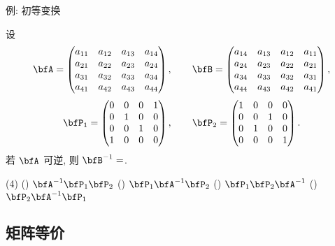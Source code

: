 \begin{frame}{例: 初等变换}
	\onslide<+->
	\begin{exercise}
		设\[\bfA=\begin{pmatrix}
			a_{11}&a_{12}&a_{13}&a_{14}\\
			a_{21}&a_{22}&a_{23}&a_{24}\\
			a_{31}&a_{32}&a_{33}&a_{34}\\
			a_{41}&a_{42}&a_{43}&a_{44}
		\end{pmatrix},\qquad\bfB=\begin{pmatrix}
			a_{14}&a_{13}&a_{12}&a_{11}\\
			a_{24}&a_{23}&a_{22}&a_{21}\\
			a_{34}&a_{33}&a_{32}&a_{31}\\
			a_{44}&a_{43}&a_{42}&a_{41}
		\end{pmatrix},\]\[\bfP_1=\begin{pmatrix}
			0&0&0&1\\
			0&1&0&0\\
			0&0&1&0\\
			1&0&0&0
		\end{pmatrix},\qquad\bfP_2=\begin{pmatrix}
			1&0&0&0\\
			0&0&1&0\\
			0&1&0&0\\
			0&0&0&1
		\end{pmatrix}.\]
		若 $\bfA$ 可逆, 则 $\bfB^{-1}=$.
		\begin{exchoice}(4)
			() $\bfA^{-1}\bfP_1\bfP_2$
			() $\bfP_1\bfA^{-1}\bfP_2$
			() $\bfP_1\bfP_2\bfA^{-1}$
			() $\bfP_2\bfA^{-1}\bfP_1$
		\end{exchoice}
	\end{exercise}
\end{frame}


\subsection{矩阵等价}


